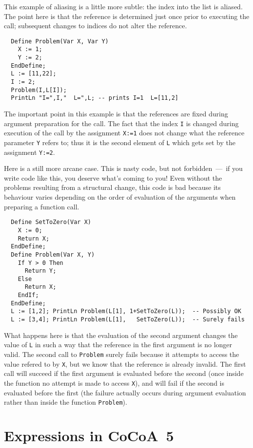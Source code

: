 \documentclass{book}[12,a4paper]
\begin{document}
This example of aliasing is a little more subtle: the index into the list
is aliased.  The point here is that the reference is determined just once
prior to executing the call; subsequent changes to indices do not alter the
reference.
\begin{lstlisting}
  Define Problem(Var X, Var Y)
    X := 1;
    Y := 2;
  EndDefine;
  L := [11,22];
  I := 2;
  Problem(I,L[I]);
  PrintLn "I=",I,"  L=",L; -- prints I=1  L=[11,2]
\end{lstlisting}
The important point in this example is that the references are fixed during argument
preparation for the call.  The fact that the index \texttt{I} is changed
during execution of the call by the assignment \texttt{X:=1} does not change
what the reference parameter \texttt{Y} refers to; thus it is the second
element of \texttt{L} which gets set by the assignment \texttt{Y:=2}.

Here is a still more arcane case.  This is nasty code, but not
forbidden~---~if you write code like this, you deserve what's coming to
you!  Even without the problems resulting from a structural change, this
code is bad because its behaviour varies depending on the order of
evaluation of the arguments when preparing a function call.
\begin{lstlisting}
  Define SetToZero(Var X)
    X := 0;
    Return X;
  EndDefine;
  Define Problem(Var X, Y)
    If Y > 0 Then
      Return Y;
    Else
      Return X;
    EndIf;
  EndDefine;
  L := [1,2]; PrintLn Problem(L[1], 1+SetToZero(L));  -- Possibly OK
  L := [3,4]; PrintLn Problem(L[1],   SetToZero(L));  -- Surely fails
\end{lstlisting}
What happens here is that the evaluation of the second argument changes the
value of \texttt{L} in such a way that the reference in the first argument is
no longer valid.  The second call to \texttt{Problem} surely fails because it
attempts to access the value refered to by \texttt{X}, but we know that the
reference is already invalid.  The first call will succeed if the first
argument is evaluated before the second (once inside the function no
attempt is made to access \texttt{X}), and will fail if the second is
evaluated before the first (the failure actually occurs during argument
evaluation rather than inside the function \texttt{Problem}).


\section{Expressions in CoCoA~5}
\end{document}
